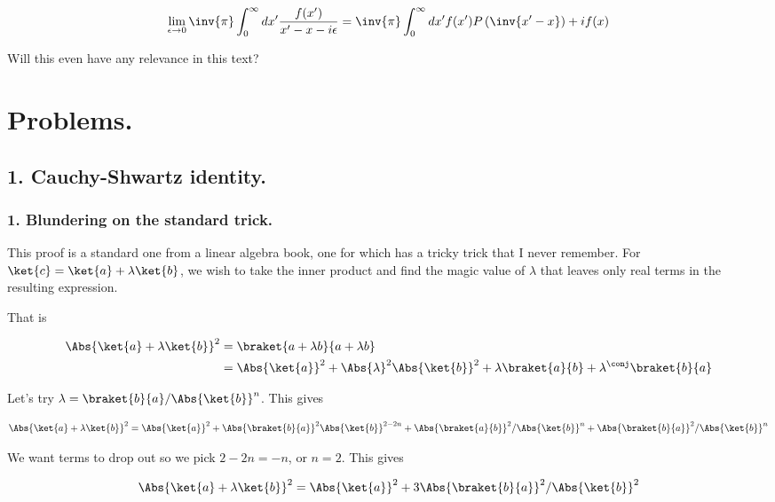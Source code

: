 \begin{align*}
\lim_{\epsilon \rightarrow 0} 
\inv{\pi} \int_0^\infty dx' \frac{f(x')}{x'-x - i \epsilon}
= 
\inv{\pi} \int_0^\infty dx' f(x') P\left( \inv{x' - x} \right) + i f(x)
\end{align*}

Will this even have any relevance in this text?

\section{Problems.}
\subsection{1. Cauchy-Shwartz identity.}
\subsubsection{1. Blundering on the standard trick.}

This proof is a standard one from a linear algebra book, one for which has a tricky trick that I never remember.  For $\ket{c} = \ket{a} + \lambda \ket{b}$, we wish to take the inner product and find the magic value of $\lambda$ that leaves only real terms in the resulting expression.

That is

\begin{align*}
\Abs{\ket{a} + \lambda \ket{b}}^2 
&=
\braket{a + \lambda b}{a + \lambda b} \\
&= \Abs{\ket{a}}^2 + \Abs{\lambda}^2 \Abs{\ket{b}}^2 + \lambda \braket{a}{b} + \lambda^\conj \braket{b}{a} \\
\end{align*}

Let's try $\lambda = \braket{b}{a}/\Abs{\ket{b}}^n$.  This gives

\begin{align*}
\Abs{\ket{a} + \lambda \ket{b}}^2 
&= \Abs{\ket{a}}^2 + \Abs{\braket{b}{a}}^2 \Abs{\ket{b}}^{2-2n} + \Abs{\braket{a}{b}}^2/\Abs{\ket{b}}^n + \Abs{\braket{b}{a}}^2/\Abs{\ket{b}}^n \\
\end{align*}

We want terms to drop out so we pick $2 -2n = -n$, or $n = 2$.  This gives

\begin{align*}
\Abs{\ket{a} + \lambda \ket{b}}^2 
&= \Abs{\ket{a}}^2 + 3 \Abs{\braket{b}{a}}^2/\Abs{\ket{b}}^2 \\
\end{align*}


